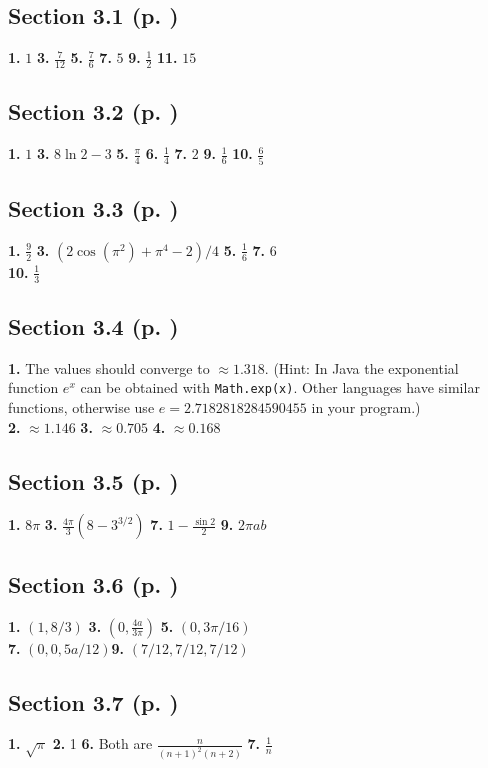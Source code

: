 \begin{multicols}{2}
\subsection*{Section 3.1 (p. \pageref{sec3dot1})}
\textbf{1.} $1$\quad
\textbf{3.} $\frac{7}{12}$\quad
\textbf{5.} $\frac{7}{6}$\quad
\textbf{7.} $5$\quad
\textbf{9.} $\frac{1}{2}$\quad
\textbf{11.} $15$
\subsection*{Section 3.2 (p. \pageref{sec3dot2})}
\textbf{1.} $1$\quad
\textbf{3.} $8\ln 2 - 3$\quad
\textbf{5.} $\frac{\pi}{4}$\quad
\textbf{6.} $\frac{1}{4}$\quad
\textbf{7.} $2$\quad
\textbf{9.} $\frac{1}{6}$\quad
\textbf{10.} $\frac{6}{5}$
\subsection*{Section 3.3 (p. \pageref{sec3dot3})}
\textbf{1.} $\frac{9}{2}$\quad
\textbf{3.} $(2\cos(\pi^2) + \pi^4 -2)/4$\quad
\textbf{5.} $\frac{1}{6}$\quad
\textbf{7.} $6$\\
\textbf{10.} $\frac{1}{3}$
\subsection*{Section 3.4 (p. \pageref{sec3dot4})}
\textbf{1.} The values should converge to $\approx 1.318$. (Hint: In Java the exponential function $e^x$ can be obtained
with \texttt{Math.exp(x)}. Other languages have
similar functions, otherwise use $e=2.7182818284590455$ in your program.)\\\textbf{2.} $\approx 1.146$\quad
\textbf{3.} $\approx 0.705$\quad
\textbf{4.} $\approx 0.168$
\subsection*{Section 3.5 (p. \pageref{sec3dot5})}
\textbf{1.} $8\pi$\quad
\textbf{3.} $\frac{4\pi}{3}(8-3^{3/2})$\quad
\textbf{7.} $1-\frac{\sin 2}{2}$\quad
\textbf{9.} $2\pi ab$
\subsection*{Section 3.6 (p. \pageref{sec3dot6})}
\textbf{1.} $(1,8/3)$\quad
\textbf{3.} $(0,\frac{4a}{3\pi})$\quad
\textbf{5.} $(0,3\pi/16)$\\\textbf{7.} $(0,0,5a/12)$\quad\textbf{9.} $(7/12,7/12,7/12)$
\subsection*{Section 3.7 (p. \pageref{sec3dot7})}
\textbf{1.} $\sqrt{\pi}$\quad
\textbf{2.} 1\quad
\textbf{6.} Both are $\frac{n}{(n+1)^2 (n+2)}$\quad
\textbf{7.} $\frac{1}{n}$\quad


\end{multicols}
